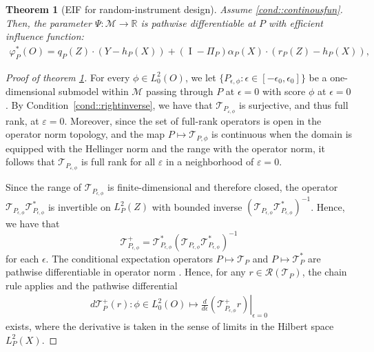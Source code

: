 \documentclass[11pt]{article}
\theoremstyle{plain}
\newtheorem{theorem}{Theorem}
\theoremstyle{definition}
\theoremstyle{remark}
\theoremstyle{definition}
\begin{document}
\begin{theorem}[EIF for random-instrument design]
Assume \ref{cond::continousfun}. Then, the parameter $\Psi: \mathcal{M} \rightarrow \mathbb{R}$ is pathwise differentiable at $P$ with efficient influence function:
    \begin{align*}
    \varphi_P^*(O) 
     = q_P(Z) \cdot \left( Y - h_P(X) \right) + (\operatorname{I} - \Pi_P) \alpha_P(X) \cdot \left( r_P(Z) - h_P(X) \right),
\end{align*}
\label{theorem::EIFrandom}
\end{theorem}
\begin{proof}[Proof of theorem \ref{theorem::EIFrandom}]
For every $\phi \in L_0^2(O)$, we let $\{ P_{\epsilon, \phi} : \epsilon \in [-\epsilon_0, \epsilon_0] \}$ be a one-dimensional submodel within $\mathcal{M}$ passing through $P$ at $\epsilon = 0$ with score $\phi$ at $\epsilon = 0$. By Condition~\ref{cond::rightinverse}, we have that \( \mathcal{T}_{P_{\varepsilon, \phi}} \) is surjective, and thus full rank, at \( \varepsilon = 0 \). Moreover, since the set of full-rank operators is open in the operator norm topology, and the map \( P \mapsto \mathcal{T}_{P, \phi} \) is continuous when the domain is equipped with the Hellinger norm and the range with the operator norm, it follows that \( \mathcal{T}_{P_{\varepsilon, \phi}} \) is full rank for all \( \varepsilon \) in a neighborhood of \( \varepsilon = 0 \).




Since the range of \( \mathcal{T}_{P_{\epsilon, \phi}} \) is finite-dimensional and therefore closed, the operator \( \mathcal{T}_{P_{\epsilon, \phi}} \mathcal{T}_{P_{\epsilon, \phi}}^* \) is invertible on $L^2_P(Z)$ with bounded inverse \( (\mathcal{T}_{P_{\epsilon, \phi}} \mathcal{T}_{P_{\epsilon, \phi}}^*)^{-1} \). Hence, we have that
\[
\mathcal{T}_{P_{\epsilon, \phi}}^+ = \mathcal{T}_{P_{\epsilon, \phi}}^* (\mathcal{T}_{P_{\epsilon, \phi}} \mathcal{T}_{P_{\epsilon, \phi}}^*)^{-1}
\]
for each \( \epsilon \). The conditional expectation operators $P \mapsto \mathcal{T}_P$ and $P \mapsto \mathcal{T}_P^*$ are pathwise differentiable in operator norm \citep{luedtke2024one, luedtke2024simplifying}. Hence, for any $r \in \mathcal{R}(\mathcal{T}_P)$, the chain rule applies and the pathwise differential
\begin{align*}
    d \mathcal{T}_P^+(r): \phi \in L^2_0(O) \mapsto \left. \frac{d}{d\epsilon} \left( \mathcal{T}_{P_{\epsilon, \phi}}^+ r \right) \right|_{\epsilon = 0}
\end{align*}
exists, where the derivative is taken in the sense of limits in the Hilbert space \( L^2_P(X) \).


\end{proof}
\end{document}
